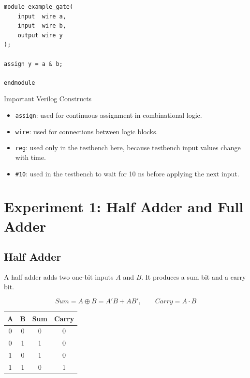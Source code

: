 \documentclass[11pt,a4paper]{article}
\begin{document}
\begin{lstlisting}[caption={Basic Verilog module template}]
module example_gate(
    input  wire a,
    input  wire b,
    output wire y
);

assign y = a & b;

endmodule
\end{lstlisting}

\begin{conceptbox}{Important Verilog Constructs}
\begin{itemize}[leftmargin=*]
    \item \texttt{assign}: used for continuous assignment in combinational logic.
    \item \texttt{wire}: used for connections between logic blocks.
    \item \texttt{reg}: used only in the testbench here, because testbench input values change with time.
    \item \texttt{\#10}: used in the testbench to wait for 10 ns before applying the next input.
\end{itemize}
\end{conceptbox}

\section{Experiment 1: Half Adder and Full Adder}

\subsection{Half Adder}

A half adder adds two one-bit inputs $A$ and $B$. It produces a sum bit and a carry bit.

$$ Sum = A \oplus B = A'B + AB', \qquad Carry = A \cdot B $$

\begin{center}
\renewcommand{\arraystretch}{1.2}
\begin{tabular}{cc|cc}
\toprule
\textbf{A} & \textbf{B} & \textbf{Sum} & \textbf{Carry} \\
\midrule
0 & 0 & 0 & 0 \\
0 & 1 & 1 & 0 \\
1 & 0 & 1 & 0 \\
1 & 1 & 0 & 1 \\
\bottomrule
\end{tabular}
\end{center}
\end{document}
